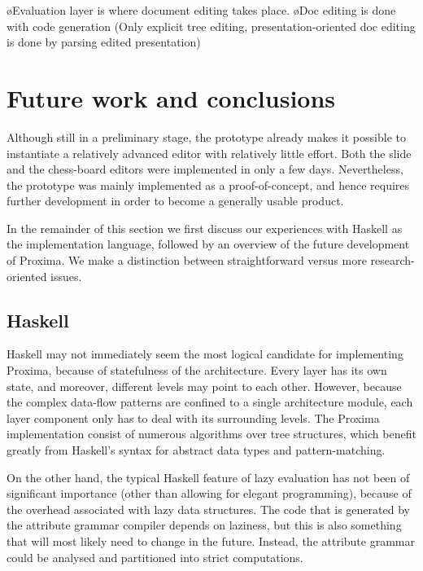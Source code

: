 \bl
\o Evaluation layer is where document editing takes place. 
\o Doc editing is done with code generation (Only explicit tree editing, presentation-oriented doc editing is done by parsing edited presentation)
\el
\ec


\section{Future work and conclusions} \label{sect:protoConcl}

Although still in a preliminary stage, the prototype already makes it possible to instantiate a relatively advanced editor with relatively little effort. Both the slide and the chess-board editors were implemented in only a few days. Nevertheless, the prototype was mainly implemented as a proof-of-concept, and hence requires further development in order to become a generally usable product.

In the remainder of this section we first discuss our experiences with Haskell as the implementation language, followed by an overview of the future development of Proxima. We make a distinction between straightforward versus more research-oriented  issues.

\subsection{Haskell}

Haskell may not immediately seem the most logical candidate for implementing Proxima, because of statefulness of the architecture. Every layer has its own state, and moreover, different levels may point to each other. However, because  the complex data-flow patterns are confined to a single architecture module, each layer component only has to deal with its surrounding levels. The Proxima implementation consist of numerous algorithms over tree structures, which benefit greatly from Haskell's syntax for abstract data types and pattern-matching. 

On the other hand, the typical Haskell feature of lazy evaluation has not been of significant importance (other than allowing for elegant programming), because of the overhead associated with lazy data structures. The code that is generated by the attribute grammar compiler depends on laziness, but this is also something that will most likely need to change in the future. Instead, the attribute grammar could be analysed and partitioned into strict computations.

